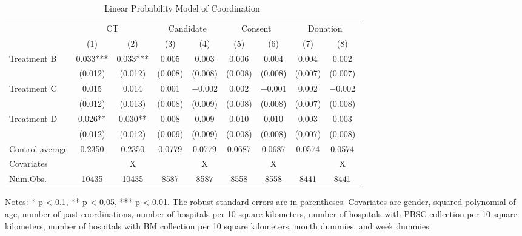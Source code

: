 \documentclass[
]{article}
\begin{document}
\begin{table}

\caption{\label{tab:est-full-coordination}Linear Probability Model of Coordination}
\centering
\fontsize{9}{11}\selectfont
\begin{threeparttable}
\begin{tabular}[t]{lcccccccc}
\toprule
\multicolumn{1}{c}{ } & \multicolumn{2}{c}{CT} & \multicolumn{2}{c}{Candidate} & \multicolumn{2}{c}{Consent} & \multicolumn{2}{c}{Donation} \\
\cmidrule(l{3pt}r{3pt}){2-3} \cmidrule(l{3pt}r{3pt}){4-5} \cmidrule(l{3pt}r{3pt}){6-7} \cmidrule(l{3pt}r{3pt}){8-9}
  & (1) & (2) & (3) & (4) & (5) & (6) & (7) & (8)\\
\midrule
Treatment B & \num{0.033}*** & \num{0.033}*** & \num{0.005} & \num{0.003} & \num{0.006} & \num{0.004} & \num{0.004} & \num{0.002}\\
 & (\num{0.012}) & (\num{0.012}) & (\num{0.008}) & (\num{0.008}) & (\num{0.008}) & (\num{0.008}) & (\num{0.007}) & (\num{0.007})\\
Treatment C & \num{0.015} & \num{0.014} & \num{0.001} & \num{-0.002} & \num{0.002} & \num{-0.001} & \num{0.002} & \num{-0.002}\\
 & (\num{0.012}) & (\num{0.013}) & (\num{0.008}) & (\num{0.009}) & (\num{0.008}) & (\num{0.008}) & (\num{0.007}) & (\num{0.008})\\
Treatment D & \num{0.026}** & \num{0.030}** & \num{0.008} & \num{0.009} & \num{0.010} & \num{0.010} & \num{0.003} & \num{0.003}\\
 & (\num{0.012}) & (\num{0.012}) & (\num{0.009}) & (\num{0.009}) & (\num{0.008}) & (\num{0.008}) & (\num{0.007}) & (\num{0.008})\\
\midrule
Control average & 0.2350 & 0.2350 & 0.0779 & 0.0779 & 0.0687 & 0.0687 & 0.0574 & 0.0574\\
Covariates &  & X &  & X &  & X &  & X\\
Num.Obs. & \num{10435} & \num{10435} & \num{8587} & \num{8587} & \num{8558} & \num{8558} & \num{8441} & \num{8441}\\
\bottomrule
\end{tabular}
\begin{tablenotes}
\item Notes: * p < 0.1, ** p < 0.05, *** p < 0.01. The robust standard errors are in parentheses. Covariates are gender, squared polynomial of age, number of past coordinations, number of hospitals per 10 square kilometers, number of hospitals with PBSC collection per 10 square kilometers, number of hospitals with BM collection per 10 square kilometers, month dummies, and week dummies.
\end{tablenotes}
\end{threeparttable}
\end{table}
\end{document}
